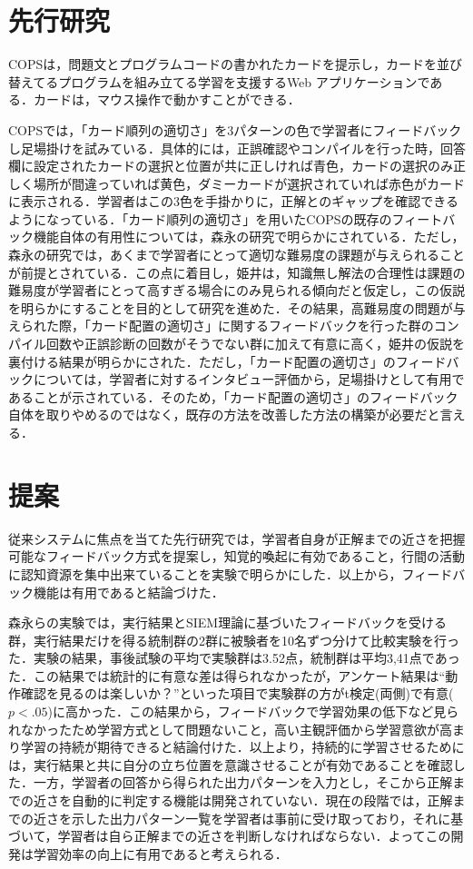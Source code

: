 \section{先行研究}
COPSは，問題文とプログラムコードの書かれたカードを提示し，カードを並び替えてるプログラムを組み立てる学習を支援するWeb アプリケーションである．カードは，マウス操作で動かすことができる． 

COPSでは，「カード順列の適切さ」を3パターンの色で学習者にフィードバックし足場掛けを試みている．具体的には，正誤確認やコンパイルを行った時，回答欄に設定されたカードの選択と位置が共に正しければ青色，カードの選択のみ正しく場所が間違っていれば黄色，ダミーカードが選択されていれば赤色がカードに表示される．学習者はこの3色を手掛かりに，正解とのギャップを確認できるようになっている．「カード順列の適切さ」を用いたCOPSの既存のフィートバック機能自体の有用性については，森永の研究\cite{morinaga2019new}で明らかにされている．ただし，森永の研究では，あくまで学習者にとって適切な難易度の課題が与えられることが前提とされている．この点に着目し，姫井は，知識無し解法の合理性は課題の難易度が学習者にとって高すぎる場合にのみ見られる傾向だと仮定し，この仮説を明らかにすることを目的として研究を進めた．その結果，高難易度の問題が与えられた際，「カード配置の適切さ」に関するフィードバックを行った群のコンパイル回数や正誤診断の回数がそうでない群に加えて有意に高く，姫井の仮説を裏付ける結果が明らかにされた．ただし，「カード配置の適切さ」のフィードバックについては，学習者に対するインタビュー評価から，足場掛けとして有用であることが示されている．そのため，「カード配置の適切さ」のフィードバック自体を取りやめるのではなく，既存の方法を改善した方法の構築が必要だと言える．

\section{提案}


従来システムに焦点を当てた先行研究では，学習者自身が正解までの近さを把握可能なフィードバック方式を提案し，知覚的喚起に有効であること，行間の活動に認知資源を集中出来ていることを実験で明らかにした\cite{morinaga2019new}．以上から，フィードバック機能は有用であると結論づけた．

森永らの実験では，実行結果とSIEM理論に基づいたフィードバックを受ける群，実行結果だけを得る統制群の2群に被験者を10名ずつ分けて比較実験を行った．実験の結果，事後試験の平均で実験群は3.52点，統制群は平均3,41点であった．この結果では統計的に有意な差は得られなかったが，アンケート結果は``動作確認を見るのは楽しいか？''といった項目で実験群の方がt検定(両側)で有意($p<.05$)に高かった．この結果から，フィードバックで学習効果の低下など見られなかったため学習方式として問題ないこと，高い主観評価から学習意欲が高まり学習の持続が期待できると結論付けた．以上より，持続的に学習させるためには，実行結果と共に自分の立ち位置を意識させることが有効であることを確認した．一方，学習者の回答から得られた出力パターンを入力とし，そこから正解までの近さを自動的に判定する機能は開発されていない．現在の段階では，正解までの近さを示した出力パターン一覧を学習者は事前に受け取っており，それに基づいて，学習者は自ら正解までの近さを判断しなければならない．よってこの開発は学習効率の向上に有用であると考えられる．

